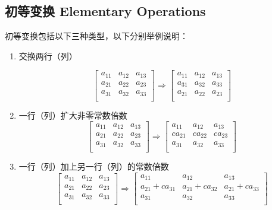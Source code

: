 
\subsection{初等变换 Elementary Operations}
初等变换包括以下三种类型，以下分别举例说明：

\begin{enumerate}
\item 交换两行（列）

\begin{equation}
\left[
    \begin{array}{ccc}
        a_{11} & a_{12} & a_{13}\\
        a_{21} & a_{22} & a_{23}\\
        a_{31} & a_{32} & a_{33}\\
    \end{array}
\right]
\Rightarrow
\left[
    \begin{array}{ccc}
        a_{11} & a_{12} & a_{13}\\
        a_{31} & a_{32} & a_{33}\\
        a_{21} & a_{22} & a_{23}\\
    \end{array}
\right]
\end{equation}

\item 一行（列）扩大非零常数倍数
\begin{equation}
\left[
    \begin{array}{ccc}
        a_{11} & a_{12} & a_{13}\\
        a_{21} & a_{22} & a_{23}\\
        a_{31} & a_{32} & a_{33}\\
    \end{array}
\right]
\Rightarrow
\left[
    \begin{array}{ccc}
        a_{11} & a_{12} & a_{13}\\
        ca_{21} & ca_{22} & ca_{23}\\
        a_{31} & a_{32} & a_{33}\\
    \end{array}
\right]
\end{equation}
\item 一行（列）加上另一行（列）的常数倍数
\begin{equation}
\left[
    \begin{array}{ccc}
        a_{11} & a_{12} & a_{13}\\
        a_{21} & a_{22} & a_{23}\\
        a_{31} & a_{32} & a_{33}\\
    \end{array}
\right]
\Rightarrow
\left[
    \begin{array}{ccc}
        a_{11} & a_{12} & a_{13}\\
        a_{21}+ca_{31} & a_{21}+ca_{32} & a_{21}+ca_{33}\\
        a_{31} & a_{32} & a_{33}\\
    \end{array}
\right]
\end{equation}
\end{enumerate}

